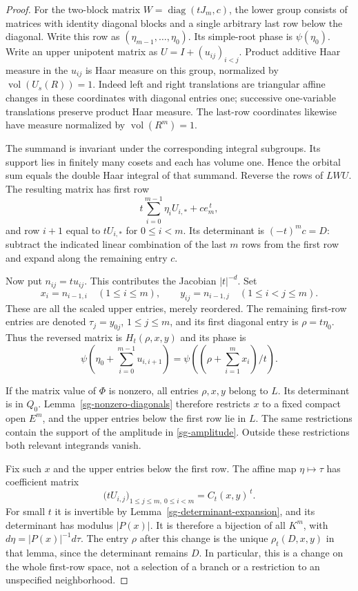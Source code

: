 \begin{proof}
For the two-block matrix $W=\operatorname{diag}(tJ_m,c)$,
the lower group consists of matrices with identity diagonal
blocks and a single arbitrary last row below the diagonal.
Write this row as $(\eta_{m-1},\ldots,\eta_0)$.
Its simple-root phase is $\psi(\eta_0)$.
Write an upper unipotent matrix as $U=I+(u_{ij})_{i<j}$.
Product additive Haar measure in the $u_{ij}$ is Haar measure
on this group, normalized by $\operatorname{vol}(U_s(R))=1$.
Indeed left and right translations are triangular affine
changes in these coordinates with diagonal entries one;
successive one-variable translations preserve product Haar
measure.  The last-row coordinates likewise have measure
normalized by $\operatorname{vol}(R^m)=1$.

The summand is invariant under the corresponding integral
subgroups.  Its support lies in finitely many cosets and each
has volume one.  Hence the orbital sum equals the double
Haar integral of that summand.  Reverse the rows of $LWU$.
The resulting matrix has first row
\[
 t\sum_{i=0}^{m-1}\eta_i U_{i,*}+c e_m^{\,t},
\]
and row $i+1$ equal to $tU_{i,*}$ for $0\le i<m$.
Its determinant is $(-t)^mc=D$: subtract the indicated
linear combination of the last $m$ rows from the first row
and expand along the remaining entry $c$.

Now put $n_{ij}=tu_{ij}$.  This contributes the Jacobian
$|t|^{-d}$.  Set
\[
 x_i=n_{i-1,i}\quad(1\le i\le m),\qquad
 y_{ij}=n_{i-1,j}\quad(1\le i<j\le m).
\]
These are all the scaled upper entries, merely reordered.
The remaining first-row entries are denoted
$\tau_j=y_{0j}$, $1\le j\le m$, and its first diagonal
entry is $\rho=t\eta_0$.  Thus the reversed matrix is
$H_t(\rho,x,y)$ and its phase is
\begin{equation}\label{sg-coordinate-phase}
 \psi\left(\eta_0+\sum_{i=0}^{m-1}u_{i,i+1}\right)
              =\psi\left((\rho+\sum_{i=1}^m x_i)/t\right).
\end{equation}

If the matrix value of $\Phi$ is nonzero, all entries
$\rho,x,y$ belong to $L$.  Its determinant is in $Q_0$.
Lemma~\ref{sg-nonzero-diagonals} therefore restricts $x$ to
a fixed compact open $E^m$, and the upper entries below
the first row lie in $L$.  The same restrictions contain
the support of the amplitude in \eqref{sg-amplitude}.
Outside these restrictions both relevant integrands vanish.

Fix such $x$ and the upper entries below the first row.
The affine map $\eta\mapsto\tau$ has coefficient matrix
\[
             \bigl(tU_{i,j}\bigr)_{1\le j\le m,\ 0\le i<m}
                     =C_t(x,y)^{\,t}.
\]
For small $t$ it is invertible by
Lemma~\ref{sg-determinant-expansion}, and its determinant
has modulus $|P(x)|$.  It is therefore a bijection of all
$K^m$, with $d\eta=|P(x)|^{-1}d\tau$.
The entry $\rho$ after this change is the unique
$\rho_t(D,x,y)$ in that lemma, since the determinant remains
$D$.  In particular, this is a change on the whole first-row
space, not a selection of a branch or a restriction to an
unspecified neighborhood.


\end{proof}
